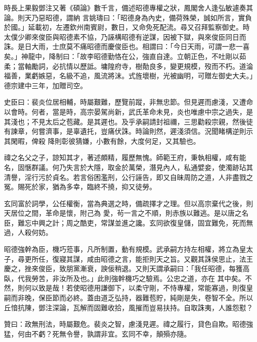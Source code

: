 \begin{pinyinscope}
 時長上果毅鄧注又著《碩論》數千言，備述昭德專權之狀，鳳閣舍人逢弘敏遽奏其論。則天乃惡昭德，謂納
 言姚璹曰：「昭德身為內史，備荷殊榮，誠如所言，實負於國。」延載初，左遷欽州南賓尉，數日，又命免死配流。尋又召拜監察御史。時太僕少卿來俊臣與昭德素不協，乃誣構昭德有逆謀，因被下獄，與來俊臣同日而誅。是日大雨，士庶莫不痛昭德而慶俊臣也。相謂曰：「今日天雨，可謂一悲一喜矣。」神龍中，降制曰：「故李昭德勤恪在公，強直自達。立朝正色，不吐剛以茹柔；當軸勵詞，必抗情以歷詆。墉隍府寺，樹勣良多，變更規模，歿而不朽。道淪
 福善，業虧嫉惡，名級不追，風流將沫。式旌壞樹，光被幽明，可贈左御史大夫。」德宗建中三年，加贈司空。



 史臣曰：裴炎位居相輔，時屬艱難，歷覽前蹤，非無忠節。但見遲而慮淺，又遭命以會時。何者，當是時，高宗晏駕尚新，武氏革命未見，炎也唯慮中宗之過失，是其淺也；不見太后之苞藏。是其遲也。及乎承嗣請封祖禰，三思勸殺宗親，然後徒有諫章，何嘗濟事，是辜遺托，豈痛伏誅。時論則然，遲淺須信。況聞睹構逆則示其閑暇，俾殺
 降則彰彼猜嫌，小數有餘，大度何足，又其驗也。



 禕之名父之子，諒知其才，著述頗精，履歷無愧。師範王府，秉執相權，咸有能名，固愜群議。何乃失言於大隱，取金於萬榮，潛見內人，私通嬖妾，使濁跡玷其清譽，淫行污於貞名。若言俗困濫刑，公行誣告，即又自昧周防之道，人非盡戮之冤。賜死於家，猶為多幸，臨終不撓，抑又徒勞。



 玄同富於詞學，公任權衡，當為典選之時，備疏擇才之理。但以高宗棄代之後，則天居位之間，革命是懷，附己為
 愛，茍一言之不順，則赤族以難逃。是以唐之名臣，難忘中興之計；周之酷吏，常謀並進之讒。玄同欲復皇儲，固宜難免，死而無過，人殺何妨。



 昭德強幹為臣，機巧蒞事，凡所制置，動有規模。武承嗣方持左相權，將立為皇太子，尋更所任，復寢其謀，咸由昭德之言，能拒則天之旨。又觀其誅侯思止，法王慶之，挫來俊臣，致朋黨漸衰，諛佞稍退。又則天謂承嗣曰：「我任昭德，每獲高臥，代我勞苦，非汝所及也。」此則強幹機巧之驗焉。公忠之道，亦在
 其中矣。不然，則何以致是哉！若使昭德用謙御下，以柔守剛，不恃專權，常能寡過，則復皇嗣而非晚，保臣節而必終。蓋由道乏弘持，器難苞貯，純剛是失，卷智不全。所以丘愔抗陳，鄧注深論，瓦解而固難收拾，風摧而豈易扶持。自取誅夷，人誰怨懟？



 贊曰：政無刑法，時屬艱危。裴炎之智，慮淺見遲。禕之履行，貸色自欺。昭德強猛，何由不虧？死無令譽，孰謂非宜。玄同不幸，顛殞亦隨。



\end{pinyinscope}